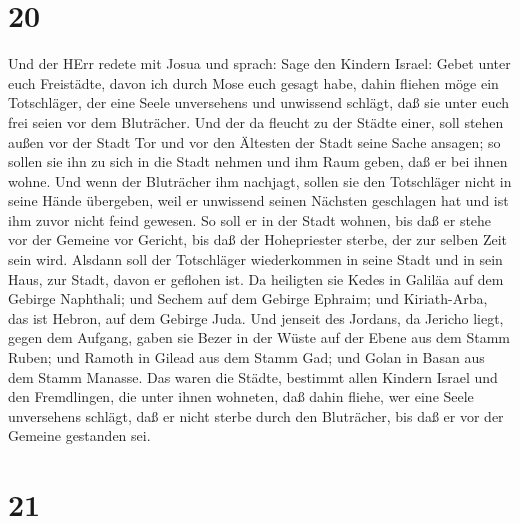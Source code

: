 \hypertarget{section-19}{%
\section{20}\label{section-19}}

 Und der HErr redete mit Josua und sprach:  Sage
den Kindern Israel: Gebet unter euch Freistädte, davon ich durch Mose
euch gesagt habe,  dahin fliehen möge ein Totschläger, der
eine Seele unversehens und unwissend schlägt, daß sie unter euch frei
seien vor dem Bluträcher.  Und der da fleucht zu der Städte
einer, soll stehen außen vor der Stadt Tor und vor den Ältesten der
Stadt seine Sache ansagen; so sollen sie ihn zu sich in die Stadt nehmen
und ihm Raum geben, daß er bei ihnen wohne.  Und wenn der
Bluträcher ihm nachjagt, sollen sie den Totschläger nicht in seine Hände
übergeben, weil er unwissend seinen Nächsten geschlagen hat und ist ihm
zuvor nicht feind gewesen.  So soll er in der Stadt wohnen,
bis daß er stehe vor der Gemeine vor Gericht, bis daß der Hohepriester
sterbe, der zur selben Zeit sein wird. Alsdann soll der Totschläger
wiederkommen in seine Stadt und in sein Haus, zur Stadt, davon er
geflohen ist.  Da heiligten sie Kedes in Galiläa auf dem
Gebirge Naphthali; und Sechem auf dem Gebirge Ephraim; und Kiriath-Arba,
das ist Hebron, auf dem Gebirge Juda.  Und jenseit des
Jordans, da Jericho liegt, gegen dem Aufgang, gaben sie Bezer in der
Wüste auf der Ebene aus dem Stamm Ruben; und Ramoth in Gilead aus dem
Stamm Gad; und Golan in Basan aus dem Stamm Manasse.  Das
waren die Städte, bestimmt allen Kindern Israel und den Fremdlingen, die
unter ihnen wohneten, daß dahin fliehe, wer eine Seele unversehens
schlägt, daß er nicht sterbe durch den Bluträcher, bis daß er vor der
Gemeine gestanden sei.

\hypertarget{section-20}{%
\section{21}\label{section-20}}

